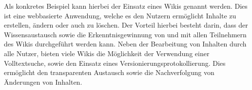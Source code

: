 Als konkretes Beispiel kann hierbei der Einsatz eines Wikis genannt werden. Dies ist eine webbasierte Anwendung, welche es den Nutzern ermöglicht Inhalte zu erstellen, ändern oder auch zu löschen. Der Vorteil hierbei besteht darin, dass der Wissensaustausch sowie die Erkenntnisgewinnung von und mit allen Teilnehmern des Wikis durchgeführt werden kann. Neben der Bearbeitung von Inhalten durch alle Nutzer, bieten viele Wikis die Möglichkeit der Verwendung einer Volltextsuche, sowie den Einsatz eines Versionierungsprotokollierung. Dies ermöglicht den transparenten Austausch sowie die Nachverfolgung von Änderungen von Inhalten. \cite[S. 75 f.]{Mertins.2009}

